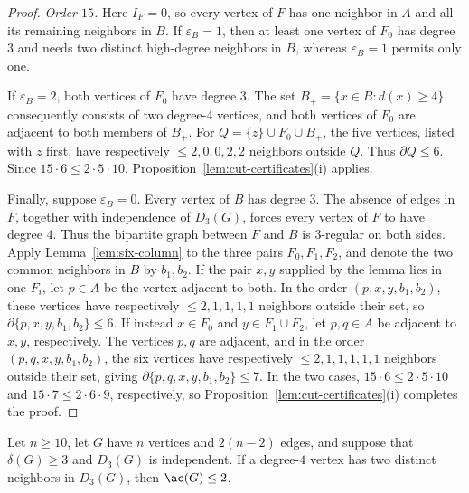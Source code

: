 \begin{proof}
\smallskip
\noindent\emph{Order \(15\).}
Here \(I_F=0\), so every vertex of \(F\) has one neighbor in \(A\) and
all its remaining neighbors in \(B\).  If \(\varepsilon_B=1\), then at least one
vertex of \(F_0\) has degree \(3\) and needs two distinct high-degree
neighbors in \(B\), whereas \(\varepsilon_B=1\) permits only one.

If \(\varepsilon_B=2\), both vertices of \(F_0\) have degree \(3\).  The set
\(B_+=\{x\in B:d(x)\ge4\}\) consequently consists of two degree-\(4\)
vertices, and both vertices of \(F_0\) are adjacent to both members of
\(B_+\).  For \(Q=\{z\}\cup F_0\cup B_+\), the five vertices, listed with
\(z\) first, have respectively \(\le2,0,0,2,2\) neighbors outside \(Q\).
Thus \(\partial Q\le6\).
Since \(15\cdot6\le2\cdot5\cdot10\),
Proposition~\ref{lem:cut-certificates}(i) applies.

Finally, suppose \(\varepsilon_B=0\).  Every vertex of \(B\) has degree \(3\).
The absence of edges in \(F\), together with independence of \(D_3(G)\),
forces every vertex of \(F\) to have degree \(4\).  Thus the bipartite
graph between \(F\) and \(B\) is \(3\)-regular on both sides.
Apply Lemma~\ref{lem:six-column} to the three pairs
\(F_0,F_1,F_2\), and denote the two common neighbors in \(B\) by
\(b_1,b_2\).  If the pair \(x,y\) supplied by the lemma lies in one \(F_i\), let
\(p\in A\) be the vertex adjacent to both.  In the order
\((p,x,y,b_1,b_2)\), these vertices have respectively
\(\le2,1,1,1,1\) neighbors outside their set, so
\(\partial\{p,x,y,b_1,b_2\}\le6\).  If instead \(x\in F_0\) and
\(y\in F_1\cup F_2\), let \(p,q\in A\) be adjacent to \(x,y\), respectively.
The vertices \(p,q\) are adjacent, and in the order
\((p,q,x,y,b_1,b_2)\), the six vertices have respectively
\(\le2,1,1,1,1,1\) neighbors outside their set, giving
\(\partial\{p,q,x,y,b_1,b_2\}\le7\).  In the two cases,
\(15\cdot6\le2\cdot5\cdot10\) and
\(15\cdot7\le2\cdot6\cdot9\), respectively, so
Proposition~\ref{lem:cut-certificates}(i) completes the proof.
\end{proof}

\begin{lemma}\label{lem:sharp-shared-hub}
Let \(n\ge10\), let \(G\) have \(n\) vertices and \(2(n-2)\) edges,
and suppose that \(\delta(G)\ge3\) and \(D_3(G)\) is independent.
If a degree-\(4\) vertex has two distinct neighbors in \(D_3(G)\), then
\(\ac(G)\le2\).
\end{lemma}

